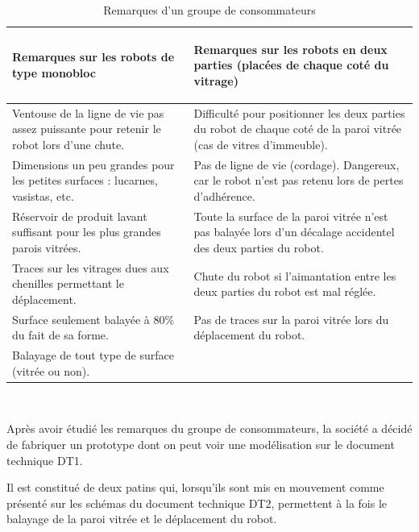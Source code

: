 \begin{table}[ht!]
\begin{tabularx}{\linewidth}{|X|X|}
\hline
\rowcolor{gray}
\begin{center}
Remarques sur les robots de type monobloc
\end{center}
 & \begin{center}
Remarques sur les robots en deux parties (placées de chaque coté du vitrage)
\end{center}
\\
\hline
Ventouse de la ligne de vie pas assez puissante pour retenir le robot lors d'une chute.
& Difficulté pour positionner les deux parties du robot de chaque coté de la paroi vitrée (cas de vitres d'immeuble). \\
\hline
Dimensions un peu grandes pour les petites surfaces : lucarnes, vasistas, etc.
& Pas de ligne de vie (cordage). Dangereux, car le robot n'est pas retenu lors de pertes
d'adhérence.\\
\hline
Réservoir de produit lavant suffisant pour les plus grandes parois vitrées.
& Toute la surface de la paroi vitrée n'est pas balayée lors d'un décalage accidentel des deux parties du robot.\\
\hline
Traces sur les vitrages dues aux chenilles permettant le déplacement.
& Chute du robot si l'aimantation entre les deux parties du robot est mal réglée.\\
\hline
Surface seulement balayée à 80\% du fait de sa forme. & Pas de traces sur la paroi vitrée lors du déplacement du robot. \\
\hline
Balayage de tout type de surface (vitrée ou non).& \\
\hline
\end{tabularx}
\caption{\label{tab01} Remarques d'un groupe de consommateurs}
\end{table}


~\

Après avoir étudié les remarques du groupe de consommateurs, la société a décidé de
fabriquer un prototype dont on peut voir une modélisation sur le document technique DT1.

Il est constitué de deux patins qui, lorsqu'ils sont mis en mouvement comme présenté sur
les schémas du document technique DT2, permettent à la fois le balayage de la
paroi vitrée et le déplacement du robot.


